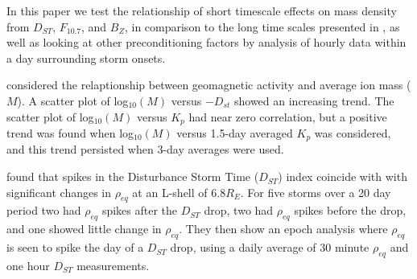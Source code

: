 \documentclass[10pt,twocolumn]{article}
\begin{document}

In this paper we test the relationship of short timescale effects on mass density from $D_{ST}$, $F_{10.7}$, and $B_Z$, in comparison to the long time scales presented in \cite{Takahashi2010,Takahashi2006}, as well as looking at other preconditioning factors by analysis of hourly data within a day surrounding storm onsets.  



\cite{Takahashi2006} considered the relaptionship between geomagnetic activity and average ion mass ($M$).  A scatter plot of log$_{10}(M)$ versus $-D_{st}$ showed an increasing trend.  The scatter plot of log$_{10}(M)$ versus $K_p$ had near zero correlation, but a positive trend was found when log$_{10}(M)$ versus 1.5-day averaged $K_p$ was considered, and this trend persisted when 3-day averages were used. 

\cite{Takahashi2010} found that spikes in the Disturbance Storm Time ($D_{ST}$) index coincide with with significant changes in $\rho_{eq}$ at an L-shell of 6.8$R_E$. For five storms over a 20 day period two had $\rho_{eq}$ spikes after the $D_{ST}$ drop, two had $\rho_{eq}$ spikes before the drop, and one showed little change in $\rho_{eq}$. They then show an epoch analysis where $\rho_{eq}$ is seen to spike the day of a $D_{ST}$ drop, using a daily average of 30 minute $\rho_{eq}$ and one hour $D_{ST}$ measurements. 
\end{document}
